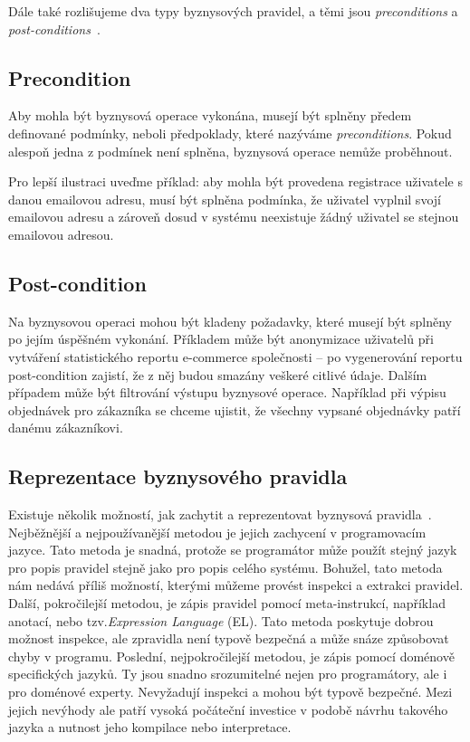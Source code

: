Dále také rozlišujeme dva typy byznysových pravidel, a těmi jsou \textit{preconditions}
a \textit{post-conditions}~\cite{cemus2015automated}.

\subsection{Precondition}

Aby mohla být byznysová operace vykonána, musejí
být splněny předem definované podmínky, neboli předpoklady,
které nazýváme \textit{preconditions}. Pokud alespoň jedna z podmínek
není splněna, byznysová operace nemůže proběhnout.

Pro lepší ilustraci uveďme příklad: aby mohla být provedena
registrace uživatele s danou emailovou adresu, musí být splněna
podmínka, že uživatel vyplnil svojí emailovou adresu a zároveň
dosud v systému neexistuje žádný uživatel se stejnou emailovou adresou.

\subsection{Post-condition}

Na byznysovou operaci mohou být kladeny požadavky, které
musejí být splněny po jejím úspěšném vykonání. Příkladem
může být anonymizace uživatelů při vytváření statistického
reportu e-commerce společnosti – po vygenerování reportu
post-condition zajistí, že z něj budou smazány veškeré citlivé údaje.
Dalším případem může být filtrování výstupu byznysové operace.
Například při výpisu objednávek pro zákazníka se chceme ujistit, že
všechny vypsané objednávky patří danému zákazníkovi.

\subsection{Reprezentace byznysového pravidla}

Existuje několik možností, jak zachytit a reprezentovat byznysová pravidla~\cite{cemus2015automated}.
Nejběžnější a nejpoužívanější metodou je jejich zachycení v programovacím
jazyce. Tato metoda je snadná, protože se programátor může použít stejný jazyk
pro popis pravidel stejně jako pro popis celého systému. Bohužel, tato metoda
nám nedává příliš možností, kterými můžeme provést inspekci a extrakci pravidel.
Další, pokročilejší metodou, je zápis pravidel pomocí meta-instrukcí, například anotací,
nebo tzv.\textit{Expression Language} (EL). Tato metoda poskytuje dobrou možnost inspekce,
ale zpravidla není typově bezpečná a může snáze způsobovat chyby v programu.
Poslední, nejpokročilejší metodou, je zápis pomocí doménově specifických jazyků.
Ty jsou snadno srozumitelné nejen pro programátory, ale i pro doménové experty.
Nevyžadují inspekci a mohou být typově bezpečné. Mezi jejich nevýhody ale patří vysoká
počáteční investice v podobě návrhu takového jazyka a nutnost jeho kompilace nebo
interpretace.

